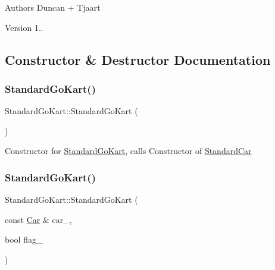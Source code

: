 \begin{DoxyAuthor}{Authors}
Duncan + Tjaart 
\end{DoxyAuthor}
\begin{DoxyVersion}{Version}
1.. 
\end{DoxyVersion}


\subsection{Constructor \& Destructor Documentation}
\mbox{\label{class_standard_go_kart_a9c4bbd015d1ae8b94a0b5f8ffd4e39b4}} 
\subsubsection{\texorpdfstring{Standard\+Go\+Kart()}{StandardGoKart()}\hspace{0.1cm}{\footnotesize\ttfamily [1/2]}}
{\footnotesize\ttfamily Standard\+Go\+Kart\+::\+Standard\+Go\+Kart (\begin{DoxyParamCaption}{ }\end{DoxyParamCaption})\hspace{0.3cm}{\ttfamily [inline]}}

Constructor for \mbox{\hyperlink{class_standard_go_kart}{Standard\+Go\+Kart}}, calls Constructor of \mbox{\hyperlink{class_standard_car}{Standard\+Car}} \mbox{\label{class_standard_go_kart_a92a4c08dfe2816ec215c05287a2c15c8}} 
\subsubsection{\texorpdfstring{Standard\+Go\+Kart()}{StandardGoKart()}\hspace{0.1cm}{\footnotesize\ttfamily [2/2]}}
{\footnotesize\ttfamily Standard\+Go\+Kart\+::\+Standard\+Go\+Kart (\begin{DoxyParamCaption}\item[{const \mbox{\hyperlink{class_car}{Car}} \&}]{car\+\_\+,  }\item[{bool}]{flag\+\_\+ }\end{DoxyParamCaption})\hspace{0.3cm}{\ttfamily [inline]}}

